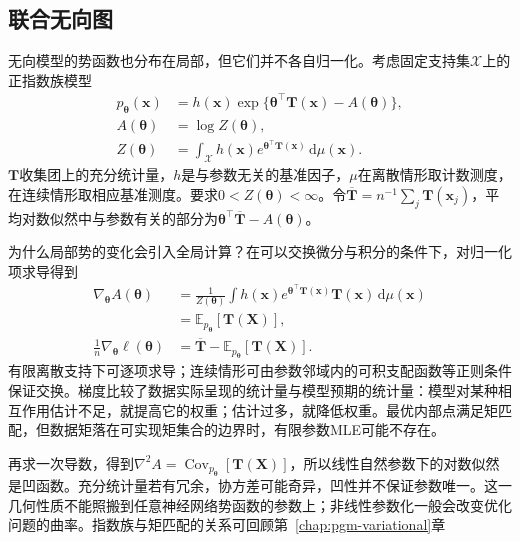 \subsection{联合无向图}
\label{sec:pgm-parameter-learning-undirected}

无向模型的势函数也分布在局部，但它们并不各自归一化。考虑固定支持集$\mathcal{X}$上的正指数族模型
\begin{equation}
  \begin{aligned}
    p_{\bm{\theta}}(\bm{x})
      &=h(\bm{x})
        \exp\{\bm{\theta}^\top\bm{T}(\bm{x})-A(\bm{\theta})\},\\
    A(\bm{\theta})&=\log Z(\bm{\theta}),\\
    Z(\bm{\theta})
      &=\int_{\mathcal{X}}h(\bm{x})
        e^{\bm{\theta}^\top\bm{T}(\bm{x})}\,\mathrm{d}\mu(\bm{x}).
  \end{aligned}
  \label{eq:pgm-parameter-learning-exponential-model}
\end{equation}
$\bm{T}$收集团上的充分统计量，$h$是与参数无关的基准因子，$\mu$在离散情形取计数测度，在连续情形取相应基准测度。要求$0<Z(\bm{\theta})<\infty$。令$\overline{\bm{T}}=n^{-1}\sum_j\bm{T}(\bm{x}_j)$，平均对数似然中与参数有关的部分为$\bm{\theta}^\top\overline{\bm{T}}-A(\bm{\theta})$。

为什么局部势的变化会引入全局计算？在可以交换微分与积分的条件下，对归一化项求导得到
\begin{equation}
  \begin{aligned}
    \nabla_{\bm{\theta}} A(\bm{\theta})
      &=\frac{1}{Z(\bm{\theta})}
        \int h(\bm{x})e^{\bm{\theta}^\top\bm{T}(\bm{x})}
             \bm{T}(\bm{x})\,\mathrm{d}\mu(\bm{x})\\
      &=\mathbb{E}_{p_{\bm{\theta}}}[\bm{T}(\bm{X})],\\
    \frac{1}{n}\nabla_{\bm{\theta}}\ell(\bm{\theta})
      &=\overline{\bm{T}}
        -\mathbb{E}_{p_{\bm{\theta}}}[\bm{T}(\bm{X})].
  \end{aligned}
  \label{eq:pgm-parameter-learning-moment-gradient}
\end{equation}
有限离散支持下可逐项求导；连续情形可由参数邻域内的可积支配函数等正则条件保证交换。梯度比较了数据实际呈现的统计量与模型预期的统计量：模型对某种相互作用估计不足，就提高它的权重；估计过多，就降低权重。最优内部点满足矩匹配，但数据矩落在可实现矩集合的边界时，有限参数MLE可能不存在。

再求一次导数，得到$\nabla^2A=\operatorname{Cov}_{p_{\bm{\theta}}}[\bm{T}(\bm{X})]$，所以线性自然参数下的对数似然是凹函数。充分统计量若有冗余，协方差可能奇异，凹性并不保证参数唯一。这一几何性质不能照搬到任意神经网络势函数的参数上；非线性参数化一般会改变优化问题的曲率。指数族与矩匹配的关系可回顾第~\ref{chap:pgm-variational}章

